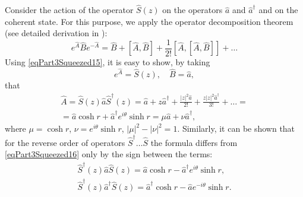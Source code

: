 Consider the action of the operator $\hat{S}\left(z\right)$ on the operators
$\hat{a}$ and $\hat{a}^{\dag}$ and on the coherent state. For this purpose,
we apply the operator decomposition theorem (see detailed derivation
in ):  
\begin{equation}
e^{\hat{A}}\hat{B}e^{-\hat{A}} = 
\hat{B} + \left[\hat{A},\hat{B}\right] + 
\frac{1}{2!} \left[\hat{A},\left[\hat{A},\hat{B}\right]\right] + \dots
\label{eqPart3Squeezed15}
\end{equation}
Using \eqref{eqPart3Squeezed15}, it is easy to show, by taking
\[
e^{\hat{A}} = \hat{S}\left(z\right), \quad \hat{B} = \hat{a},
\]
that
\begin{eqnarray}
\hat{A} = \hat{S}\left(z\right)\hat{a}\hat{S}^{\dag}\left(z\right) =
\hat{a} + z \hat{a}^{\dag} + \frac{\left|z\right|^2\hat{a}}{2!} +
\frac{z\left|z\right|^2\hat{a}^{\dag}}{3!} + \dots = 
\nonumber \\
=\hat{a} \cosh r + \hat{a}^{\dag} e^{i\theta} \sinh r = 
\mu \hat{a} + \nu \hat{a}^{\dag},
\label{eqPart3Squeezed16}
\end{eqnarray}
where $\mu = \cosh r$, $\nu = e^{i\theta} \sinh r$, $\left|\mu\right|^2 -
\left|\nu\right|^2  = 1$.
Similarly, it can be shown that for the reverse order of operators
$\hat{S}^{\dag} \dots \hat{S}$ the formula differs from \eqref{eqPart3Squeezed16} only by the sign between
the terms:
\begin{eqnarray}
\hat{S}^{\dag}\left(z\right)\hat{a}\hat{S}\left(z\right) 
=\hat{a} \cosh r - \hat{a}^{\dag} e^{i\theta} \sinh r,
\nonumber \\
\hat{S}^{\dag}\left(z\right)\hat{a}^{\dag}\hat{S}\left(z\right) 
=\hat{a}^{\dag} \cosh r - \hat{a} e^{-i\theta} \sinh r.
\label{eqPart3Squeezed16a}
\end{eqnarray}

